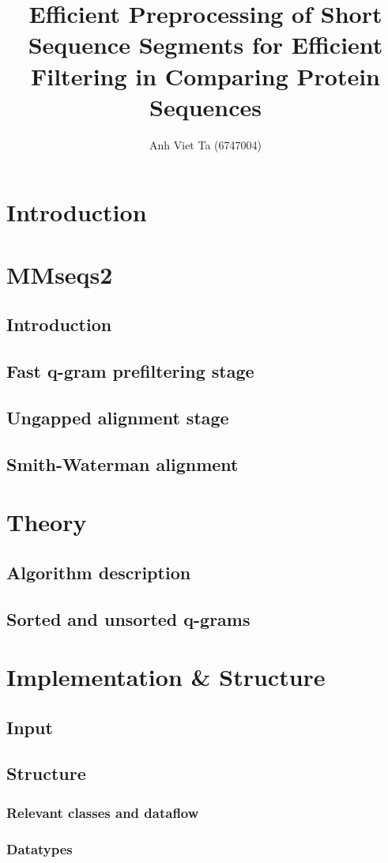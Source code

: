 \documentclass[11pt,a4paper]{scrartcl}
\title{Efficient Preprocessing of Short Sequence Segments for Efficient Filtering in Comparing Protein Sequences}
\author{Anh Viet Ta (6747004)}
\begin{document}
\section{Introduction}
\section{MMseqs2}
\subsection{Introduction}
\subsection{Fast q-gram prefiltering stage}
\subsection{Ungapped alignment stage}
\subsection{Smith-Waterman alignment}
\section{Theory}
\subsection{Algorithm description}
\subsection{Sorted and unsorted q-grams}
\section{Implementation \& Structure}
\subsection{Input}
\subsection{Structure}
\subsubsection{Relevant classes and dataflow}
\subsubsection{Datatypes}
\end{document}
